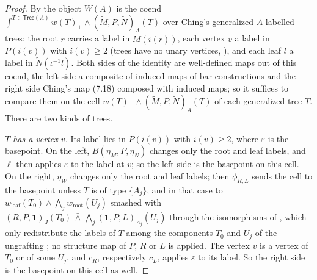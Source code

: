 \documentclass[11pt]{amsart}
\theoremstyle{definition}
\theoremstyle{remark}
\newcommand{\unit}{\mathbf{1}}
\begin{document}
\begin{proof}
By \cite[Definitions 7.1, 7.7, 7.8, Proposition 7.10]{Ch05} the object $W(A)$ is the coend $\int^{T\in\mathsf{Tree}(A)}w(T)_+\wedge(\widetilde M,P,\widetilde N)_A(T)$ over Ching's generalized $A$-labelled trees: the root $r$ carries a label in $\widetilde M(i(r))$, each vertex $v$ a label in $P(i(v))$ with $i(v)\geq2$ (trees have no unary vertices, \cite[Definition 3.1, proof of Proposition 4.13]{Ch05}), and each leaf $l$ a label in $\widetilde N(\iota^{-1}l)$. Both sides of the identity are well-defined maps out of this coend, the left side a composite of induced maps of bar constructions \cite[Definition 8.3]{AC1} and the right side Ching's map (7.18) composed with induced maps; so it suffices to compare them on the cell $w(T)_+\wedge(\widetilde M,P,\widetilde N)_A(T)$ of each generalized tree $T$. There are two kinds of trees.

\emph{$T$ has a vertex $v$.} Its label lies in $P(i(v))$ with $i(v)\geq2$, where $\varepsilon$ is the basepoint. On the left, $B(\eta_M,P,\eta_N)$ changes only the root and leaf labels, and $\ell$ then applies $\varepsilon$ to the label at $v$; so the left side is the basepoint on this cell. On the right, $\eta_W$ changes only the root and leaf labels; then $\phi_{R,L}$ \cite[Definition 7.25]{Ch05} sends the cell to the basepoint unless $T$ is of type $\{A_j\}$, and in that case to $w_{\mathrm{leaf}}(T_0)\wedge\bigwedge_j w_{\mathrm{root}}(U_j)$ smashed with $(R,P,\unit)_J(T_0)\,\bar\wedge\,\bigwedge_j(\unit,P,L)_{A_j}(U_j)$ through the isomorphisms of \cite[Definition 7.25]{Ch05}, which only redistribute the labels of $T$ among the components $T_0$ and $U_j$ of the ungrafting \cite[Definition 7.21]{Ch05}; no structure map of $P$, $R$ or $L$ is applied. The vertex $v$ is a vertex of $T_0$ or of some $U_j$, and $c_R$, respectively $c_L$, applies $\varepsilon$ to its label. So the right side is the basepoint on this cell as well.


\end{proof}
\end{document}
